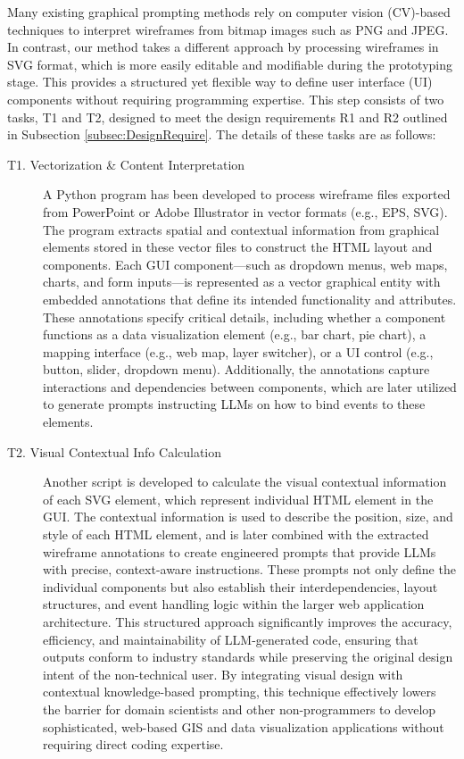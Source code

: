 Many existing graphical prompting methods rely on computer vision (CV)-based techniques to interpret wireframes from bitmap images such as PNG and JPEG. In contrast, our method takes a different approach by processing wireframes in SVG format, which is more easily editable and modifiable during the prototyping stage. This provides a structured yet flexible way to define user interface (UI) components without requiring programming expertise. This step consists of two tasks, T1 and T2, designed to meet the design requirements R1 and R2 outlined in Subsection \ref{subsec:DesignRequire}. The details of these tasks are as follows:
\begin{description}
    \item[T1. Vectorization \& Content Interpretation] A Python program has been developed to process wireframe files exported from PowerPoint or Adobe Illustrator in vector formats (e.g., EPS, SVG). The program extracts spatial and contextual information from graphical elements stored in these vector files to construct the HTML layout and components. Each GUI component—such as dropdown menus, web maps, charts, and form inputs—is represented as a vector graphical entity with embedded annotations that define its intended functionality and attributes. These annotations specify critical details, including whether a component functions as a data visualization element (e.g., bar chart, pie chart), a mapping interface (e.g., web map, layer switcher), or a UI control (e.g., button, slider, dropdown menu). Additionally, the annotations capture interactions and dependencies between components, which are later utilized to generate prompts instructing LLMs on how to bind events to these elements.
    \item[T2. Visual Contextual Info Calculation]  Another script is developed to calculate the visual contextual information of each SVG element, which represent individual HTML element in the GUI. The contextual information is used to describe the position, size, and style of each HTML element, and is later combined with the extracted wireframe annotations to create engineered prompts that provide LLMs with precise, context-aware instructions. These prompts not only define the individual components but also establish their interdependencies, layout structures, and event handling logic within the larger web application architecture. This structured approach significantly improves the accuracy, efficiency, and maintainability of LLM-generated code, ensuring that outputs conform to industry standards while preserving the original design intent of the non-technical user. By integrating visual design with contextual knowledge-based prompting, this technique effectively lowers the barrier for domain scientists and other non-programmers to develop sophisticated, web-based GIS and data visualization applications without requiring direct coding expertise. 


\end{description}
